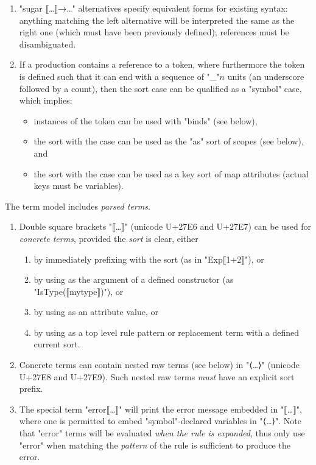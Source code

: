 \documentclass[11pt]{article} %
\begin{document}
\begin{manual}
\begin{enumerate}
  \item "sugar ⟦…⟧→…" alternatives specify equivalent forms for existing syntax: anything matching
    the left alternative will be interpreted the same as the right one (which must have been
    previously defined); references must be disambiguated.

  \item If a production contains a reference to a token, where furthermore the token is defined such
    that it can end with a sequence of "_"$n$ units (an underscore followed by a count), then the
    sort case can be qualified as a "symbol" case, which implies:
    \begin{itemize}
    \item instances of the token can be used with "binds" (see below),
    \item the sort with the case can be used as the "as" sort of scopes (see below), and
    \item the sort with the case can be used as a key sort of map attributes (actual keys must be variables).
    \end{itemize}

  \end{enumerate}
\end{manual}

\begin{manual}\label{man:parsed}
  The term model includes \emph{parsed terms}.
  \begin{enumerate}

  \item Double square brackets "⟦…⟧" (unicode U+27E6 and U+27E7) can be used for \emph{concrete
      terms}, provided the \emph{sort} is clear, either
    \begin{enumerate}
    \item by immediately prefixing with the sort (as in "Exp⟦1+2⟧"), or
    \item by using as the argument of a defined constructor (as "IsType(⟦mytype⟧)"), or
    \item by using as an attribute value, or
    \item by using as a top level rule pattern or replacement term with a defined current sort.
    \end{enumerate}

  \item Concrete terms can contain nested raw terms (see below) in "⟨…⟩" (unicode U+27E8 and
    U+27E9). Such nested raw terms \emph{must} have an explicit sort prefix.

  \item The special term "error⟦…⟧" will print the error message embedded in "⟦…⟧", where one is
    permitted to embed "symbol"-declared variables in "⟨…⟩". Note that "error" terms will be
    evaluated \emph{when the rule is expanded}, thus only use "error" when matching the
    \emph{pattern} of the rule is sufficient to produce the error.

  \end{enumerate}
\end{manual}
\end{document}
